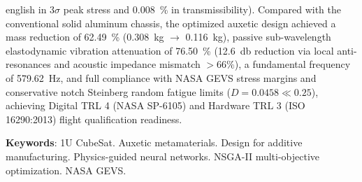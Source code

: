 \begin{resumo}[Abstract]
\begin{otherlanguage*}{english}
in $3\sigma$ peak stress and \SI[output-decimal-marker={.}]{0.008}{\percent} in transmissibility). Compared with the conventional solid aluminum chassis, the optimized auxetic design achieved a mass reduction of \SI[output-decimal-marker={.}]{62.49}{\percent} (\SI[output-decimal-marker={.}]{0.308}{\kilo\gram} $\to$ \SI[output-decimal-marker={.}]{0.116}{\kilo\gram}), passive sub-wavelength elastodynamic vibration attenuation of \SI[output-decimal-marker={.}]{76.50}{\percent} (\SI[output-decimal-marker={.}]{12.6}{\decibel} reduction via local anti-resonances and acoustic impedance mismatch $> 66\%$), a fundamental frequency of \SI[output-decimal-marker={.}]{579.62}{\hertz}, and full compliance with NASA GEVS stress margins and conservative notch Steinberg random fatigue limits ($D = 0.0458 \ll 0.25$), achieving Digital TRL 4 (NASA SP-6105) and Hardware TRL 3 (ISO 16290:2013) flight qualification readiness.

\vspace{\onelineskip}
\noindent
\textbf{Keywords}: 1U CubeSat. Auxetic metamaterials. Design for additive manufacturing. Physics-guided neural networks. NSGA-II multi-objective optimization. NASA GEVS.
\end{otherlanguage*}
\end{resumo}
